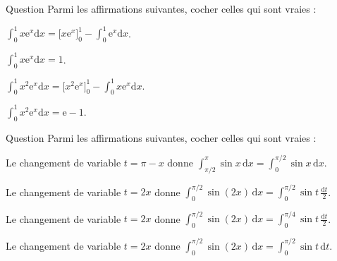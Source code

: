 \begin{multi}{Question}
Parmi les affirmations suivantes, cocher celles qui sont vraies :

    \item* \(\displaystyle \int _0^1x\mathrm{e}^x\mathrm{d}x=\Big[x\mathrm{e}^x\Big]_0^1-\int _0^1\mathrm{e}^x\mathrm{d}x\).
    \item* \(\displaystyle \int _0^1x\mathrm{e}^x\mathrm{d}x=1\).
    \item \(\displaystyle \int _0^1x^2\mathrm{e}^x\mathrm{d}x=\Big[x^2\mathrm{e}^x\Big]_0^1-\int _0^1x\mathrm{e}^x\mathrm{d}x\).
    \item \(\displaystyle \int _0^1x^2\mathrm{e}^x\mathrm{d}x=\mathrm{e}-1\).
\end{multi}


\begin{multi}[multiple,feedback=
{Avec \(t=\pi -x\), on a : \(\mathrm{d}t=-\mathrm{d}x\), \(t(\pi/2)=\pi/2\), \(t(\pi)=0\) et 
\[\int _{\pi /2}^{\pi}\sin x\,\mathrm{d}x=-\int _{\pi /2}^0\sin (\pi-t)\,\mathrm{d}t=\int _0^{\pi /2}\sin t\,\mathrm{d}t.\]
Avec le changement de variable \(t=2x\), on a : \(\mathrm{d}t=2\mathrm{d}x\), \(t(0)=0\), \(t(\pi/2)=\pi\) et 
\[\int _0^{\pi /2}\sin (2x)\,\mathrm{d}x=\frac{1}{2}\int _0^{\pi }\sin t\,\mathrm{d}t=\int _0^{\pi /2}\sin t\,\mathrm{d}t\quad \mbox{car}\quad \int _{\pi /2}^{\pi}\sin t\,\mathrm{d}t=\int _0^{\pi /2}\sin t\,\mathrm{d}t.\]
}]{Question}
Parmi les affirmations suivantes, cocher celles qui sont vraies :

    \item* Le changement de variable \(t=\pi -x\) donne \(\displaystyle \int _{\pi /2}^{\pi}\sin x\,\mathrm{d}x=\int _0^{\pi /2}\sin x\,\mathrm{d}x\).
    \item Le changement de variable \(t=2x\) donne \(\displaystyle \int _0^{\pi /2}\sin (2x)\,\mathrm{d}x=\int _0^{\pi /2}\sin t\,\frac{\mathrm{d}t}{2}\).
    \item Le changement de variable \(t=2x\) donne \(\displaystyle \int _0^{\pi /2}\sin (2x)\,\mathrm{d}x=\int _0^{\pi /4}\sin t\,\frac{\mathrm{d}t}{2}\).
    \item* Le changement de variable \(t=2x\) donne \(\displaystyle \int _0^{\pi /2}\sin (2x)\,\mathrm{d}x=\int _0^{\pi /2}\sin t\,\mathrm{d}t\).
\end{multi}


